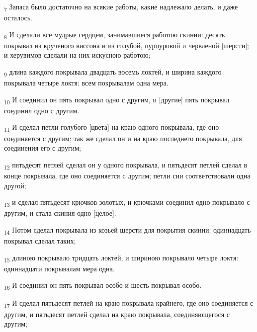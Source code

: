 \begin{tcolorbox}
\textsubscript{7} Запаса было достаточно на всякие работы, какие надлежало делать, и даже осталось.
\end{tcolorbox}
\begin{tcolorbox}
\textsubscript{8} И сделали все мудрые сердцем, занимавшиеся работою скинии: десять покрывал из крученого виссона и из голубой, пурпуровой и червленой [шерсти]; и херувимов сделали на них искусною работою;
\end{tcolorbox}
\begin{tcolorbox}
\textsubscript{9} длина каждого покрывала двадцать восемь локтей, и ширина каждого покрывала четыре локтя: всем покрывалам одна мера.
\end{tcolorbox}
\begin{tcolorbox}
\textsubscript{10} И соединил он пять покрывал одно с другим, и [другие] пять покрывал соединил одно с другим.
\end{tcolorbox}
\begin{tcolorbox}
\textsubscript{11} И сделал петли голубого [цвета] на краю одного покрывала, где оно соединяется с другим; так же сделал он и на краю последнего покрывала, для соединения его с другим;
\end{tcolorbox}
\begin{tcolorbox}
\textsubscript{12} пятьдесят петлей сделал он у одного покрывала, и пятьдесят петлей сделал в конце покрывала, где оно соединяется с другим; петли сии соответствовали одна другой;
\end{tcolorbox}
\begin{tcolorbox}
\textsubscript{13} и сделал пятьдесят крючков золотых, и крючками соединил одно покрывало с другим, и стала скиния одно [целое].
\end{tcolorbox}
\begin{tcolorbox}
\textsubscript{14} Потом сделал покрывала из козьей шерсти для покрытия скинии: одиннадцать покрывал сделал таких;
\end{tcolorbox}
\begin{tcolorbox}
\textsubscript{15} длиною покрывало тридцать локтей, и шириною покрывало четыре локтя: одиннадцати покрывалам мера одна.
\end{tcolorbox}
\begin{tcolorbox}
\textsubscript{16} И соединил он пять покрывал особо и шесть покрывал особо.
\end{tcolorbox}
\begin{tcolorbox}
\textsubscript{17} И сделал пятьдесят петлей на краю покрывала крайнего, где оно соединяется с другим, и пятьдесят петлей сделал на краю покрывала, соединяющегося с другим;
\end{tcolorbox}
